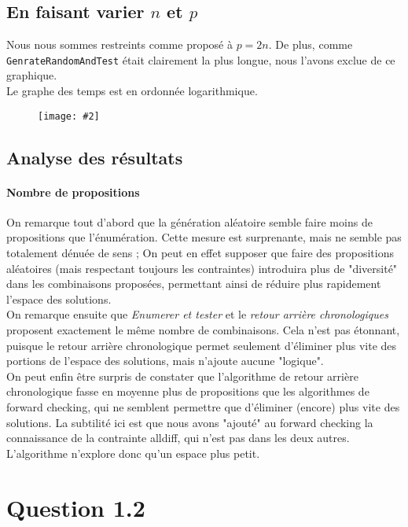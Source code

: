 \documentclass[a4paper, 12pt]{report}
\newcommand{\py}[1]{\texttt{#1}}
\newcommand{\cfigure}[3][6cm]{
	\begin{figure}[H]
		\centering
		\texttt{[image: \#2]}
	\end{figure}
}
\begin{document}
\subsection*{En faisant varier $n$ et $p$}

Nous nous sommes restreints comme proposé à $p = 2n$. De plus, comme \py{GenrateRandomAndTest} était clairement la plus longue, nous l'avons exclue de ce graphique. \\

Le graphe des temps est en ordonnée logarithmique.

\cfigure[7cm]{Figure_4.png}{}

\subsection*{Analyse des résultats}

\paragraph*{Nombre de propositions}

On remarque tout d'abord que la génération aléatoire semble faire moins de propositions que l'énumération. Cette mesure est surprenante, mais ne semble pas totalement dénuée de sens ; On peut en effet supposer que faire des propositions aléatoires (mais respectant toujours les contraintes) introduira plus de "diversité" dans les combinaisons proposées, permettant ainsi de réduire plus rapidement l'espace des solutions. \\

On remarque ensuite que \textit{Enumerer et tester} et le \textit{retour arrière chronologiques} proposent exactement le même nombre de combinaisons. Cela n'est pas étonnant, puisque le retour arrière chronologique permet seulement d'éliminer plus vite des portions de l'espace des solutions, mais n'ajoute aucune "logique". \\

On peut enfin être surpris de constater que l'algorithme de retour arrière chronologique fasse en moyenne plus de propositions que les algorithmes de forward checking, qui ne semblent permettre que d'éliminer (encore) plus vite des solutions. La subtilité ici est que nous avons "ajouté" au forward checking la connaissance de la contrainte alldiff, qui n'est pas dans les deux autres. L'algorithme n'explore donc qu'un espace plus petit.

\section*{Question 1.2}
\end{document}
